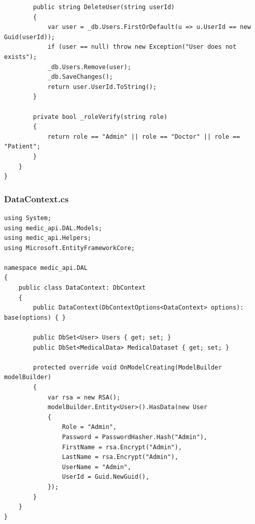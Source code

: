 \documentclass[12pt,a4paper]{article}
\begin{document}
\begin{lstlisting}
        public string DeleteUser(string userId)
        {
            var user = _db.Users.FirstOrDefault(u => u.UserId == new Guid(userId));
            if (user == null) throw new Exception("User does not exists");
            _db.Users.Remove(user);
            _db.SaveChanges();
            return user.UserId.ToString();
        }

        private bool _roleVerify(string role)
        {
            return role == "Admin" || role == "Doctor" || role == "Patient";
        }
    }
}
	\end{lstlisting}
	\subsubsection{DataContext.cs}
	\begin{lstlisting}
using System;
using medic_api.DAL.Models;
using medic_api.Helpers;
using Microsoft.EntityFrameworkCore;

namespace medic_api.DAL
{
    public class DataContext: DbContext
    {
        public DataContext(DbContextOptions<DataContext> options): base(options) { }
        
        public DbSet<User> Users { get; set; }
        public DbSet<MedicalData> MedicalDataset { get; set; }

        protected override void OnModelCreating(ModelBuilder modelBuilder)
        {
            var rsa = new RSA();
            modelBuilder.Entity<User>().HasData(new User
            {
                Role = "Admin",
                Password = PasswordHasher.Hash("Admin"),
                FirstName = rsa.Encrypt("Admin"),
                LastName = rsa.Encrypt("Admin"),
                UserName = "Admin",
                UserId = Guid.NewGuid(),
            });
        }
    }
}
	\end{lstlisting}
\end{document}
